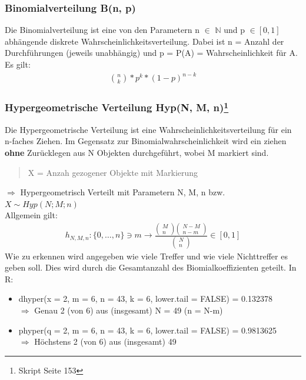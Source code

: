 \documentclass[a4paper,10pt]{scrartcl}
\begin{document}
\subsubsection{Binomialverteilung B(n, p)}
Die Binomialverteilung ist eine von den Parametern n $\in$ $\mathbb{N}$ und p $\in [0,1]$ abhängende diskrete Wahrscheinlichkeitsverteilung. Dabei ist n = Anzahl der Durchführungen (jeweils unabhängig) und p = P(A) = Wahrscheinlichkeit für A. Es gilt:
\begin{eqnarray*}
\binom{n}{k} * p^k * (1-p)^{n-k}
\end{eqnarray*}
\subsubsection[Hypergeometrische Verteilung Hyp(N, M, n)]{Hypergeometrische Verteilung Hyp(N, M, n)\footnote{Skript Seite 153}}
Die Hypergeometrische Verteilung ist eine Wahrscheinlichkeitsverteilung für ein n-faches Ziehen. Im Gegensatz zur Binomialwahrscheinlichkeit wird ein ziehen \textbf{ohne} Zurücklegen aus N Objekten durchgeführt, wobei M markiert sind.
\begin{quote}
X = Anzah gezogener Objekte mit Markierung
\end{quote}
$\Rightarrow$ Hypergeometrisch Verteilt mit Parametern N, M, n bzw. $X \sim Hyp(N;M;n)$\\
Allgemein gilt:
\begin{eqnarray*}
{h}_{N,M,n}:\{0,\ldots, n\}\ni m\to \frac{\left(\begin{array}{c}M\\ n\end{array}\right)\left(\begin{array}{c}N-M\\ n-m\end{array}\right)}{\left(\begin{array}{c}N\\ n\end{array}\right)}\in [0,1]
\end{eqnarray*}
Wie zu erkennen wird angegeben wie viele Treffer und wie viele Nichttreffer es geben soll. Dies wird durch die Gesamtanzahl des Biomialkoeffizienten geteilt. In R:
\begin{itemize}
    \item dhyper(x = 2, m = 6, n = 43,  k = 6, lower.tail = FALSE) = 0.132378\\
    $\Rightarrow$ Genau 2 (von 6) aus (insgesamt) N = 49 (n = N-m)
    \item phyper(q = 2, m = 6, n = 43,  k = 6, lower.tail = FALSE) = 0.9813625\\
    $\Rightarrow$ Höchstens 2 (von 6) aus (insgesamt) 49
\end{itemize}
\end{document}

